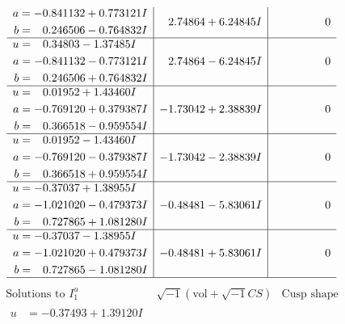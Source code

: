\documentclass[1p]{elsarticle_modified}
\theoremstyle{definition}
\newcommand{\I}{\sqrt{-1}}
\begin{document}
$$\begin{array}{c|c|c}
\begin{aligned}
a &= -0.841132 + 0.773121 I \\
b &= \phantom{-}0.246506 - 0.764832 I\end{aligned}
 & \phantom{-}2.74864 + 6.24845 I & \phantom{-0.000000 } 0 \\ \hline\begin{aligned}
u &= \phantom{-}0.34803 - 1.37485 I \\
a &= -0.841132 - 0.773121 I \\
b &= \phantom{-}0.246506 + 0.764832 I\end{aligned}
 & \phantom{-}2.74864 - 6.24845 I & \phantom{-0.000000 } 0 \\ \hline\begin{aligned}
u &= \phantom{-}0.01952 + 1.43460 I \\
a &= -0.769120 + 0.379387 I \\
b &= \phantom{-}0.366518 - 0.959554 I\end{aligned}
 & -1.73042 + 2.38839 I & \phantom{-0.000000 } 0 \\ \hline\begin{aligned}
u &= \phantom{-}0.01952 - 1.43460 I \\
a &= -0.769120 - 0.379387 I \\
b &= \phantom{-}0.366518 + 0.959554 I\end{aligned}
 & -1.73042 - 2.38839 I & \phantom{-0.000000 } 0 \\ \hline\begin{aligned}
u &= -0.37037 + 1.38955 I \\
a &= -1.021020 - 0.479373 I \\
b &= \phantom{-}0.727865 + 1.081280 I\end{aligned}
 & -0.48481 - 5.83061 I & \phantom{-0.000000 } 0 \\ \hline\begin{aligned}
u &= -0.37037 - 1.38955 I \\
a &= -1.021020 + 0.479373 I \\
b &= \phantom{-}0.727865 - 1.081280 I\end{aligned}
 & -0.48481 + 5.83061 I & \phantom{-0.000000 } 0\\
 \hline 
 \end{array}$$\newpage$$\begin{array}{c|c|c}  
\text{Solutions to }I^u_{1}& \I (\text{vol} + \sqrt{-1}CS) & \text{Cusp shape}\\
 \hline 
\begin{aligned}
u &= -0.37493 + 1.39120 I \\

\end{aligned}
\end{array}$$
\end{document}
